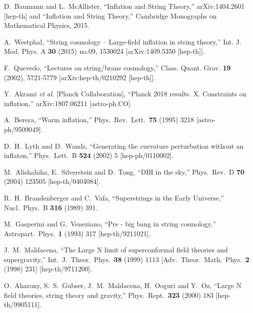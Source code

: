 \documentclass[12pt]{article}
\numberwithin{equation}{section}
\begin{document}
\begin{thebibliography}{999}
  D.~Baumann and L.~McAllister,
  ``Inflation and String Theory,''
  arXiv:1404.2601 [hep-th] and
  ``Inflation and String Theory,'' Cambridge Monographs on Mathematical 
  Physics, 2015.
  
A.~Westphal,
``String cosmology -- Large-field inflation in string theory,''
Int. J. Mod. Phys. A \textbf{30} (2015) no.09, 1530024
[arXiv:1409.5350 [hep-th]].

F.~Quevedo,
``Lectures on string/brane cosmology,''
Class. Quant. Grav. \textbf{19} (2002), 5721-5779
[arXiv:hep-th/0210292 [hep-th]].

  Y.~Akrami {\it et al.} [Planck Collaboration],
  ``Planck 2018 results. X. Constraints on inflation,''
  arXiv:1807.06211 [astro-ph.CO].

  A.~Berera, ``Warm inflation,''
  Phys.\ Rev.\ Lett.\  {\bf 75} (1995) 3218
  [astro-ph/9509049].

  D.~H.~Lyth and D.~Wands,
  ``Generating the curvature perturbation without an inflaton,''
  Phys.\ Lett.\ B {\bf 524} (2002) 5 [hep-ph/0110002].

  M.~Alishahiha, E.~Silverstein and D.~Tong,
  ``DBI in the sky,''
  Phys.\ Rev.\ D {\bf 70} (2004) 123505 [hep-th/0404084].

  R.~H.~Brandenberger and C.~Vafa,
  ``Superstrings in the Early Universe,''
  Nucl.\ Phys.\ B {\bf 316} (1989) 391.

  M.~Gasperini and G.~Veneziano,
  ``Pre - big bang in string cosmology,''
  Astropart.\ Phys.\  {\bf 1} (1993) 317 [hep-th/9211021].

  J.~M.~Maldacena,
  ``The Large N limit of superconformal field theories and supergravity,''
  Int.\ J.\ Theor.\ Phys.\  {\bf 38} (1999) 1113
   [Adv.\ Theor.\ Math.\ Phys.\  {\bf 2} (1998) 231]  [hep-th/9711200].
  
  O.~Aharony, S.~S.~Gubser, J.~M.~Maldacena, H.~Ooguri and Y.~Oz,
  ``Large N field theories, string theory and gravity,''
  Phys.\ Rept.\  {\bf 323} (2000) 183 [hep-th/9905111].
  

\end{thebibliography}
\end{document}
